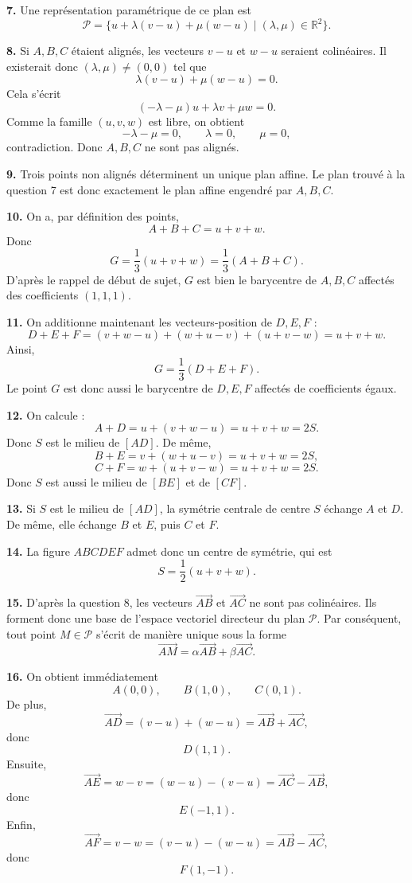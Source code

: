 \documentclass[11pt,a4paper]{article}
\newcommand{\R}{\mathbb{R}}
\newcommand{\p}[1]{\medskip\noindent\textbf{#1.}}
\begin{document}
\p{7} Une représentation paramétrique de ce plan est
\[
\mathcal P=\{u+\lambda(v-u)+\mu(w-u)\mid (\lambda,\mu)\in\R^2\}.
\]

\p{8} Si $A,B,C$ étaient alignés, les vecteurs $v-u$ et $w-u$ seraient colinéaires. Il existerait donc $(\lambda,\mu)\neq(0,0)$ tel que
\[
\lambda(v-u)+\mu(w-u)=0.
\]
Cela s'écrit
\[
(-\lambda-\mu)u+\lambda v+\mu w=0.
\]
Comme la famille $(u,v,w)$ est libre, on obtient
\[
-\lambda-\mu=0,\qquad \lambda=0,\qquad \mu=0,
\]
contradiction. Donc $A,B,C$ ne sont pas alignés.

\p{9} Trois points non alignés déterminent un unique plan affine. Le plan trouvé à la question 7 est donc exactement le plan affine engendré par $A,B,C$.

\p{10} On a, par définition des points,
\[
A+B+C=u+v+w.
\]
Donc
\[
G=\frac13(u+v+w)=\frac13(A+B+C).
\]
D'après le rappel de début de sujet, $G$ est bien le barycentre de $A,B,C$ affectés des coefficients $(1,1,1)$.

\p{11} On additionne maintenant les vecteurs-position de $D,E,F$ :
\[
D+E+F=(v+w-u)+(w+u-v)+(u+v-w)=u+v+w.
\]
Ainsi,
\[
G=\frac13(D+E+F).
\]
Le point $G$ est donc aussi le barycentre de $D,E,F$ affectés de coefficients égaux.

\p{12} On calcule :
\[
A+D=u+(v+w-u)=u+v+w=2S.
\]
Donc $S$ est le milieu de $[AD]$.
De même,
\[
B+E=v+(w+u-v)=u+v+w=2S,
\]
\[
C+F=w+(u+v-w)=u+v+w=2S.
\]
Donc $S$ est aussi le milieu de $[BE]$ et de $[CF]$.

\p{13} Si $S$ est le milieu de $[AD]$, la symétrie centrale de centre $S$ échange $A$ et $D$. De même, elle échange $B$ et $E$, puis $C$ et $F$.

\p{14} La figure $ABCDEF$ admet donc un centre de symétrie, qui est
\[
S=\frac12(u+v+w).
\]

\p{15} D'après la question 8, les vecteurs $\overrightarrow{AB}$ et $\overrightarrow{AC}$ ne sont pas colinéaires. Ils forment donc une base de l'espace vectoriel directeur du plan $\mathcal P$. Par conséquent, tout point $M\in\mathcal P$ s'écrit de manière unique sous la forme
\[
\overrightarrow{AM}=\alpha\overrightarrow{AB}+\beta\overrightarrow{AC}.
\]

\p{16} On obtient immédiatement
\[
A(0,0),\qquad B(1,0),\qquad C(0,1).
\]
De plus,
\[
\overrightarrow{AD}=(v-u)+(w-u)=\overrightarrow{AB}+\overrightarrow{AC},
\]
donc
\[
D(1,1).
\]
Ensuite,
\[
\overrightarrow{AE}=w-v=(w-u)-(v-u)=\overrightarrow{AC}-\overrightarrow{AB},
\]
donc
\[
E(-1,1).
\]
Enfin,
\[
\overrightarrow{AF}=v-w=(v-u)-(w-u)=\overrightarrow{AB}-\overrightarrow{AC},
\]
donc
\[
F(1,-1).
\]
\end{document}

